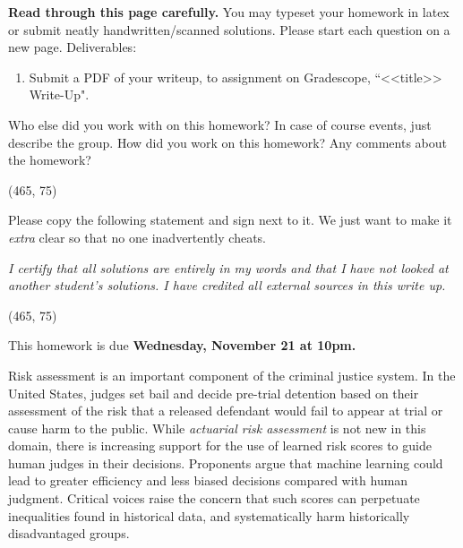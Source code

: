 \documentclass[preview]{standalone}
\begin{document}
\fontsize{12}{15}\selectfont


\textbf{Read through this page carefully.} You may typeset your homework in latex or submit neatly handwritten/scanned solutions. Please start each question on a new page. Deliverables:

\begin{enumerate}
  \item Submit a PDF of your writeup, 
  to assignment on Gradescope, ``<<title>> Write-Up". 
\end{enumerate}


\begin{Parts}

\Part Who else did you work with on this homework? In case of course events, just describe the group. How did you work on this homework? Any comments about the homework?

\vspace{15pt}
\framebox(465, 75){}

\Part Please copy the following statement and sign next to it. We just want to make it \textit{extra} clear so that no one inadvertently cheats.

\textit{I certify that all solutions are entirely in my words and that I have not looked at another student's solutions. I have credited all external sources in this write up.}

\vspace{15pt}
\framebox(465, 75){}

\end{Parts}

\pagebreak

This homework is due \textbf{Wednesday, November 21 at 10pm.}

Risk assessment is an important component of the criminal justice system. In the United States, judges set bail and decide pre-trial detention based on their assessment of the risk that a released defendant would fail to appear at trial or cause harm to the public. While \emph{actuarial risk assessment} is not new in this domain, there is increasing support for the use of learned risk scores to guide human judges in their decisions. Proponents argue that machine learning could lead to greater efficiency and less biased decisions compared with human judgment. Critical voices raise the concern that such scores can perpetuate inequalities found in historical data, and systematically harm historically disadvantaged groups.
\end{document}
